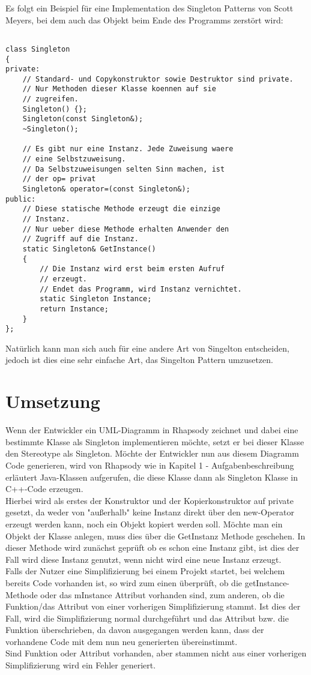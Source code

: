 Es folgt ein Beispiel für eine Implementation des Singleton Patterns von Scott Meyers, bei dem auch das Objekt beim Ende des Programms zerstört wird:
\begin{lstlisting}

class Singleton
{
private:
    // Standard- und Copykonstruktor sowie Destruktor sind private. 
    // Nur Methoden dieser Klasse koennen auf sie 
    // zugreifen.
    Singleton() {};
    Singleton(const Singleton&);
    ~Singleton();

    // Es gibt nur eine Instanz. Jede Zuweisung waere
    // eine Selbstzuweisung.
    // Da Selbstzuweisungen selten Sinn machen, ist
    // der op= privat
    Singleton& operator=(const Singleton&);
public:
    // Diese statische Methode erzeugt die einzige
    // Instanz.
    // Nur ueber diese Methode erhalten Anwender den 
    // Zugriff auf die Instanz.
    static Singleton& GetInstance() 
    {
        // Die Instanz wird erst beim ersten Aufruf
        // erzeugt.
        // Endet das Programm, wird Instanz vernichtet.
        static Singleton Instance;
        return Instance;
    }
};
\end{lstlisting}

Natürlich kann man sich auch für eine andere Art von Singelton entscheiden, jedoch ist dies eine sehr einfache Art, das Singelton Pattern umzusetzen.
\cite{singelton}\cite{singelton2}
\section{Umsetzung}

Wenn der Entwickler ein UML-Diagramm in Rhapsody zeichnet und dabei eine bestimmte Klasse als Singleton implementieren möchte, setzt er bei dieser Klasse den Stereotype als Singleton. Möchte der Entwickler nun aus diesem Diagramm Code generieren, wird von Rhapsody wie in Kapitel 1 - Aufgabenbeschreibung erläutert Java-Klassen aufgerufen, die diese Klasse dann als Singleton Klasse in C++-Code erzeugen. 
\\
Hierbei wird als erstes der Konstruktor und der Kopierkonstruktor auf private gesetzt, da weder von "außerhalb" keine Instanz direkt über den new-Operator erzeugt werden kann, noch ein Objekt kopiert werden soll. Möchte man ein Objekt der Klasse anlegen, muss dies über die GetInstanz Methode geschehen. In dieser Methode wird zunächst geprüft ob es schon eine Instanz gibt, ist dies der Fall wird diese Instanz genutzt, wenn nicht wird eine neue Instanz erzeugt.\\


Falls der Nutzer eine Simplifizierung bei einem Projekt startet, bei welchem
bereits Code vorhanden ist, so wird zum einen überprüft, ob die
getInstance-Methode oder das mInstance Attribut vorhanden sind, zum anderen, ob
die Funktion/das Attribut von einer vorherigen Simplifizierung stammt. Ist dies
der Fall, wird die Simplifizierung normal durchgeführt und das Attribut bzw. die
Funktion überschrieben, da davon ausgegangen werden kann, dass der vorhandene
Code mit dem nun neu generierten übereinstimmt. \\
Sind Funktion oder Attribut vorhanden, aber stammen nicht aus einer vorherigen
Simplifizierung wird ein Fehler generiert.
